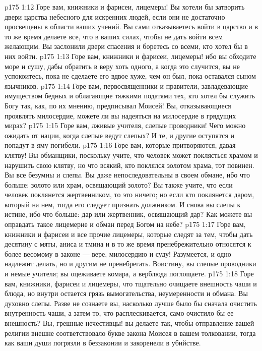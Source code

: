 \vs p175 1:12 Горе вам, книжники и фарисеи, лицемеры! Вы хотели бы затворить двери царства небесного для искренних людей, если они не достаточно просвещены в области ваших учений. Вы сами отказываетесь войти в царство и в то же время делаете все, что в ваших силах, чтобы не дать войти всем желающим. Вы заслонили двери спасения и боретесь со всеми, кто хотел бы в них войти.
\vs p175 1:13 Горе вам, книжники и фарисеи, лицемеры! ибо вы обходите море и сушу, дабы обратить в веру хоть одного, а когда это случится, вы не успокоитесь, пока не сделаете его вдвое хуже, чем он был, пока оставался сыном язычников.
\vs p175 1:14 Горе вам, первосвященники и правители, завладевающие имуществом бедных и облагающие тяжкими податями тех, кто хотел бы служить Богу так, как, по их мнению, предписывал Моисей! Вы, отказывающиеся проявлять милосердие, можете ли вы надеяться на милосердие в грядущих мирах?
\vs p175 1:15 Горе вам, лживые учителя, слепые проводники! Чего можно ожидать от нации, когда слепые ведут слепых? И те, и другие оступятся и попадут в яму погибели.
\vs p175 1:16 Горе вам, которые притворяются, давая клятву! Вы обманщики, поскольку учите, что человек может поклясться храмом и нарушить свою клятву, но что всякий, кто поклялся золотом храма, тот повинен. Вы все безумны и слепы. Вы даже непоследовательны в своем обмане, ибо что больше: золото или храм, освящающий золото? Вы также учите, что если человек поклянется жертвенником, то это ничего; но если кто поклянется даром, который на нем, тогда его следует признать должником. И снова вы слепы к истине, ибо что больше: дар или жертвенник, освящающий дар? Как можете вы оправдать такое лицемерие и обман перед Богом на небе?
\vs p175 1:17 Горе вам, книжники и фарисеи и все прочие лицемеры, которые следят за тем, чтобы дать десятину с мяты, аниса и тмина и в то же время пренебрежительно относятся к более весомому в законе --- вере, милосердию и суду! Разумеется, и одно надлежит делать, но и другим не пренебрегать. Воистину, вы слепые проводники и немые учителя; вы оцеживаете комара, а верблюда поглощаете.
\vs p175 1:18 Горе вам, книжники, фарисеи и лицемеры, что тщательно очищаете внешность чаши и блюда, но внутри остается грязь вымогательства, неумеренности и обмана. Вы духовно слепы. Разве не сознаете вы, насколько лучше было бы сначала очистить внутренность чаши, а затем то, что расплескивается, само очистило бы ее внешность? Вы, грешные нечестивцы! вы делаете так, чтобы отправление вашей религии внешне соответствовало букве закона Моисея в вашем толковании, тогда как ваши души погрязли в беззаконии и закоренели в убийстве.
